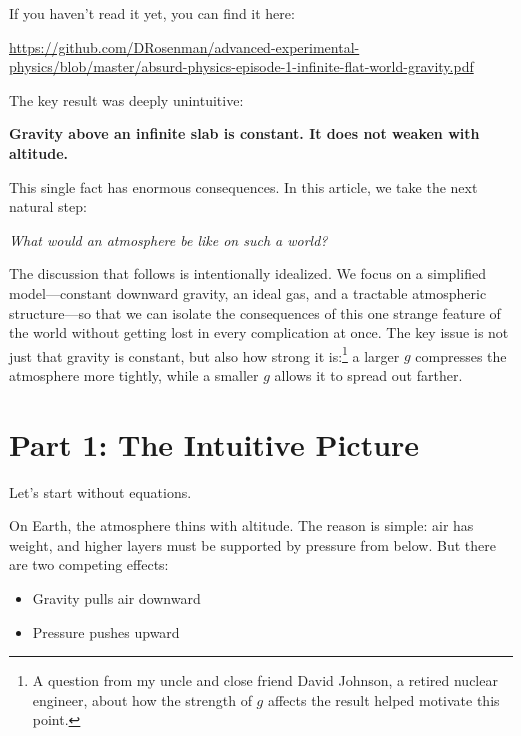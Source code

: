 \documentclass[11pt, letterpaper]{article}
\begin{document}
If you haven't read it yet, you can find it here:

\begin{center}
\url{https://github.com/DRosenman/advanced-experimental-physics/blob/master/absurd-physics-episode-1-infinite-flat-world-gravity.pdf}
\end{center}

The key result was deeply unintuitive:

\begin{center}
\textbf{Gravity above an infinite slab is constant. It does not weaken with altitude.}
\end{center}

This single fact has enormous consequences. In this article, we take the next natural step:

\begin{center}
\textit{What would an atmosphere be like on such a world?}
\end{center}

The discussion that follows is intentionally idealized. We focus on a simplified model---constant downward gravity, an ideal gas, and a tractable atmospheric structure---so that we can isolate the consequences of this one strange feature of the world without getting lost in every complication at once. The key issue is not just that gravity is constant, but also how strong it is:\footnote{A question from my uncle and close friend David Johnson, a retired nuclear engineer, about how the strength of \(g\) affects the result helped motivate this point.} a larger \(g\) compresses the atmosphere more tightly, while a smaller \(g\) allows it to spread out farther.


\section{Part 1: The Intuitive Picture}

Let’s start without equations.

On Earth, the atmosphere thins with altitude. The reason is simple: air has weight, and higher layers must be supported by pressure from below. But there are two competing effects:

\begin{itemize}
\item Gravity pulls air downward
\item Pressure pushes upward
\end{itemize}
\end{document}
